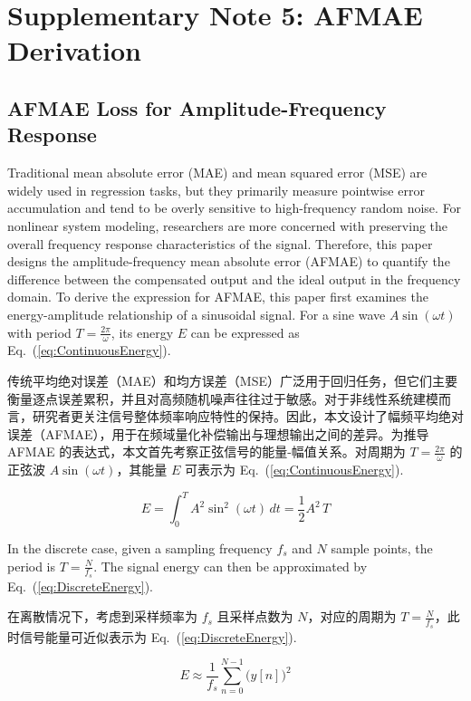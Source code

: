 \documentclass[sn-nature]{sn-jnl}
\newif\ifCNENEnglish
\newif\ifCNENBilingual
\newcommand{\CNEN}[2]{%
    \ifCNENBilingual
        #1%
        \if\relax\detokenize{#2}\relax\else\par #2\fi%
    \else
        \ifCNENEnglish
            #2%
        \else
            #1%
        \fi
    \fi
}
\newcommand{\pidx}{n} %
\newcommand{\pmax}{N} %
\begin{document}
\section{Supplementary Note 5: AFMAE Derivation}

\subsection{AFMAE Loss for Amplitude-Frequency Response}

\CNEN{传统平均绝对误差（MAE）和均方误差（MSE）广泛用于回归任务，但它们主要衡量逐点误差累积，并且对高频随机噪声往往过于敏感。对于非线性系统建模而言，研究者更关注信号整体频率响应特性的保持。因此，本文设计了幅频平均绝对误差（AFMAE），用于在频域量化补偿输出与理想输出之间的差异。为推导 AFMAE 的表达式，本文首先考察正弦信号的能量-幅值关系。对周期为 $T = \frac{2\pi}{\omega}$ 的正弦波 $A\sin(\omega t)$，其能量 $E$ 可表示为 Eq.~(\ref{eq:ContinuousEnergy}).}{
Traditional mean absolute error (MAE) and mean squared error (MSE) are widely used in regression tasks, but they primarily measure pointwise error accumulation and tend to be overly sensitive to high-frequency random noise. For nonlinear system modeling, researchers are more concerned with preserving the overall frequency response characteristics of the signal. Therefore, this paper designs the amplitude-frequency mean absolute error (AFMAE) to quantify the difference between the compensated output and the ideal output in the frequency domain. To derive the expression for AFMAE, this paper first examines the energy-amplitude relationship of a sinusoidal signal. For a sine wave $A\sin(\omega t)$ with period $T = \frac{2\pi}{\omega}$, its energy $E$ can be expressed as Eq.~(\ref{eq:ContinuousEnergy}).%
}\begin{equation}
    E = \int_{0}^{T} A^2 \sin^2(\omega t) \, dt = \frac{1}{2} A^2 \, T
    \label{eq:ContinuousEnergy}
\end{equation}

\CNEN{在离散情况下，考虑到采样频率为 $f_s$ 且采样点数为 $\pmax$，对应的周期为 $T = \frac{N}{f_s}$，此时信号能量可近似表示为 Eq.~(\ref{eq:DiscreteEnergy}).}{In the discrete case, given a sampling frequency $f_s$ and $\pmax$ sample points, the period is $T = \frac{N}{f_s}$. The signal energy can then be approximated by Eq.~(\ref{eq:DiscreteEnergy}).%
}
\begin{equation}
    E \approx \frac{1}{f_s} \sum_{\pidx=0}^{\pmax-1} \bigl(y[n]\bigr)^2
    \label{eq:DiscreteEnergy}
\end{equation}
\end{document}
